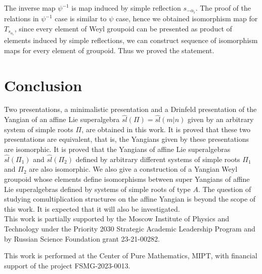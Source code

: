 \documentclass[english]{elsarticle}
\numberwithin{equation}{section}
\begin{document}
The inverse map $\psi^{-1}$ is map induced by simple reflection $s_{-\alpha_i}$. The proof of the relations in $\psi^{-1}$ case is similar to $\psi$ case, hence we obtained isomorphism map for $T_{s_{\alpha_i}}$, since every element of Weyl groupoid can be presented as product of elements induced by simple reflections, we can construct sequence of isomorphism maps for every element of groupoid. Thus we proved the statement.


\section{Conclusion}

Two presentations, a minimalistic presentation and a Drinfeld presentation of the Yangian of an affine Lie superalgebra $\hat{sl}(\Pi) = \hat{sl}(m|n)$ given by an arbitrary system of simple roots $\Pi$, are obtained in this work. It is proved that these two presentations are equivalent, that is, the Yangians given by these presentations are isomorphic. It is proved that the Yangians of affine Lie superalgebras $\hat{sl}(\Pi_1)$ and $\hat{sl}(\Pi_2)$  defined by arbitrary different systems of simple roots $\Pi_1$ and $\Pi_2$ are also isomorphic. We also give a construction of a Yangian Weyl groupoid whose elements define isomorphisms between super Yangians of affine Lie superalgebras defined by systems of simple roots of type $A$. The question of studying comultiplication structures on the affine Yangian is beyond the scope of this work. It is expected that it will also be investigated.\\



This work is partially supported by the Moscow Institute of Physics and Technology under the Priority 2030 Strategic Academic Leadership Program and by Russian Science Foundation grant 23-21-00282.

This work is performed at the Center of Pure Mathematics, MIPT, with
financial support of the project FSMG-2023-0013.
\end{document}

